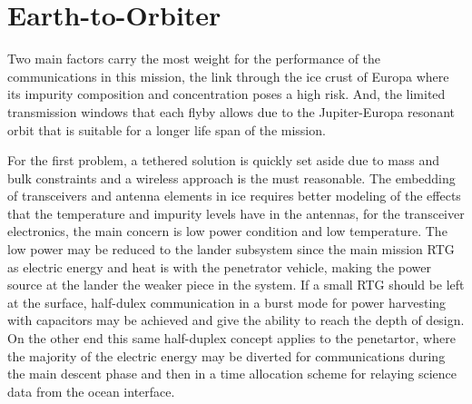 


\section{Earth-to-Orbiter}







	



Two main factors carry the most weight for the performance of the communications in this mission, the link through the ice crust of Europa where its impurity composition and concentration poses a high risk. And, the limited transmission windows that each flyby allows due to the Jupiter-Europa resonant orbit that is suitable for a longer life span of the mission.

For the first problem, a tethered solution is quickly set aside due to mass and bulk constraints and a wireless approach is the must reasonable. The embedding of transceivers and antenna elements in ice requires better modeling of the effects that the temperature and impurity levels have in the antennas, for the transceiver electronics, the main concern is low power condition and low temperature. The low power may be reduced to the lander subsystem since the main mission RTG as electric energy and heat is with the penetrator vehicle, making the power source at the lander the weaker piece in the system. If a small RTG should be left at the surface, half-dulex communication in a burst mode for power harvesting with capacitors may be achieved and give the ability to reach the depth of design. On the other end this same half-duplex concept applies to the penetartor, where the majority of the electric energy may be diverted for communications during the main descent phase and then in a time allocation scheme for relaying science data from the ocean interface.
